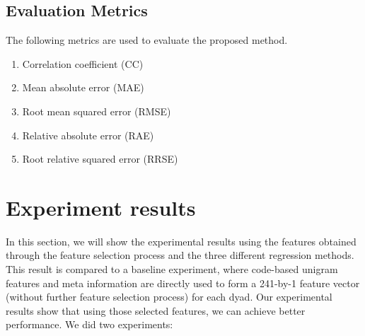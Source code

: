 \documentclass[11pt]{article} %
\begin{document}
\subsection{Evaluation Metrics}
The following metrics are used to evaluate the proposed method.

\begin{enumerate}
\item Correlation coefficient (CC)

\item Mean absolute error (MAE)

\item Root mean squared error (RMSE)

\item Relative absolute error (RAE)

\item Root relative squared error (RRSE)
\end{enumerate}

\section{Experiment results}
In this section, we will show the experimental results using the features obtained through the feature selection process and the three different regression methods. This result is compared to a baseline experiment, where code-based unigram features and meta information are directly used to form a 241-by-1 feature vector (without further feature selection process) for each dyad. Our experimental results show that using those selected features, we can achieve better performance. We did two experiments:
\end{document}
